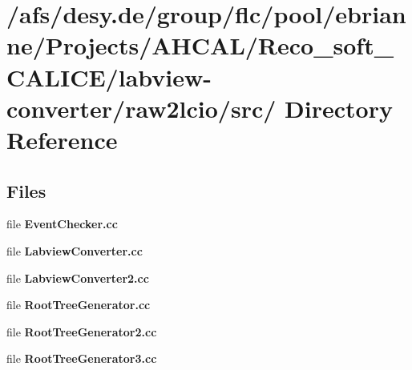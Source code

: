 \section{/afs/desy.de/group/flc/pool/ebrianne/Projects/AHCAL/Reco\_\-soft\_\-CALICE/labview-converter/raw2lcio/src/ Directory Reference}
\label{dir_d85041cf67ee28c7f5693b4af2f90777}
\subsection*{Files}
\begin{CompactItemize}
\item 
file \textbf{Event\-Checker.cc}
\item 
file \textbf{Labview\-Converter.cc}
\item 
file \textbf{Labview\-Converter2.cc}
\item 
file \textbf{Root\-Tree\-Generator.cc}
\item 
file \textbf{Root\-Tree\-Generator2.cc}
\item 
file \textbf{Root\-Tree\-Generator3.cc}
\end{CompactItemize}
